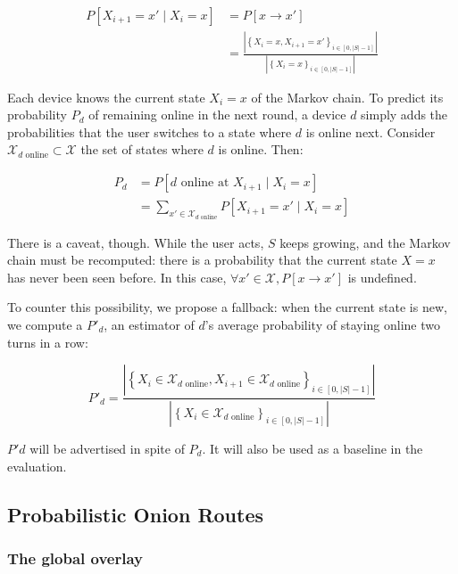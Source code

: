 \begin{align*}
P\left[X_{i+1}=x' \mid X_i=x \right] &= P\left[x \rightarrow x' \right] \\&= \frac{\left| \left\{ X_i = x, X_{i+1} = x' \right\}_{i \in \left[0, |S| - 1\right]} \right|}{\left| \left\{ X_i = x \right\}_{i \in \left[0, |S| - 1\right]} \right|}
\end{align*}

Each device knows the current state $X_i=x$ of the Markov chain.
To predict its probability $P_d$ of remaining online in the next round, 
a device $d$ simply adds the probabilities that the user switches to a state where $d$ is online next.
Consider $\mathcal{X}_{d\text{ online}} \subset \mathcal{X}$ the set of states where $d$ is online. Then:

\begin{align*}
P_d & = P\left[d\text{ online at }X_{i+1} \mid X_i=x\right] \\ & = \sum\limits_{x' \in \mathcal{X}_{d\text{ online}}} P\left[ X_{i+1}=x' \mid X_i=x \right]
\end{align*}

There is a caveat, though.
While the user acts, $S$ keeps growing, and the Markov chain must be recomputed: there is a probability that the current state $X=x$ has never been seen before.
In this case, $\forall x' \in \mathcal{X}, P\left[x \rightarrow x'\right]$ is undefined.

To counter this possibility, we propose a fallback:
when the current state is new, we compute a $P'_d$, an estimator of $d$'s average probability of staying online two turns in a row:

$$ P'_d = \frac{\left| \left\{ X_i \in \mathcal{X}_{d\text{ online}}, X_{i+1} \in \mathcal{X}_{d\text{ online}} \right\}_{i \in \left[0, |S| - 1\right]} \right|}{\left| \left\{ X_i \in \mathcal{X}_{d\text{ online}} \right\}_{i \in \left[0, |S| - 1\right]} \right|} $$

$P'd$ will be advertised in spite of $P_d$. It will also be used as a baseline in the evaluation.

\subsection{Probabilistic Onion Routes}
\label{ssec:por}


\subsubsection{The global overlay}
\label{sssec:global_overlay}

